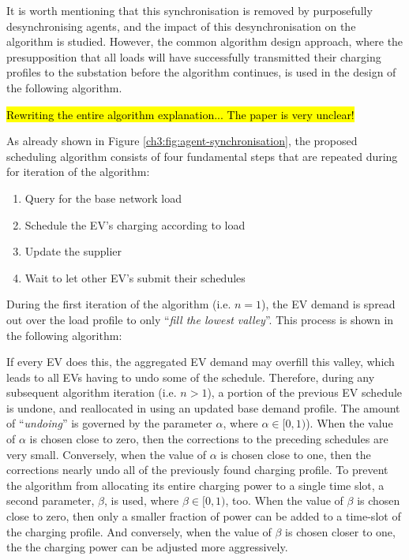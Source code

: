 It is worth mentioning that this synchronisation is removed by purposefully desynchronising agents, and the impact of this desynchronisation on the algorithm is studied.
However, the common algorithm design approach, where the presupposition that all loads will have successfully transmitted their charging profiles to the substation before the algorithm continues, is used in the design of the following algorithm.

\hl{Rewriting the entire algorithm explanation... The paper is very unclear!}

As already shown in Figure \ref{ch3:fig:agent-synchronisation}, the proposed scheduling algorithm consists of four fundamental steps that are repeated during for iteration of the algorithm:

\begin{enumerate}
	\item Query for the base network load
	\item Schedule the EV's charging according to load
	\item Update the supplier
	\item Wait to let other EV's submit their schedules
\end{enumerate}

During the first iteration of the algorithm (i.e. $n=1$), the EV demand is spread out over the load profile to only ``\textit{fill the lowest valley}''.
This process is shown in the following algorithm:



If every EV does this, the aggregated EV demand may overfill this valley, which leads to all EVs having to undo some of the schedule.
Therefore, during any subsequent algorithm iteration (i.e. $n>1$), a portion of the previous EV schedule is undone, and reallocated in using an updated base demand profile.
The amount of ``\textit{undoing}'' is governed by the parameter $\alpha$, where $\alpha \in [0, 1)$).
When the value of $\alpha$ is chosen close to zero, then the corrections to the preceding schedules are very small.
Conversely, when the value of $\alpha$ is chosen close to one, then the corrections nearly undo all of the previously found charging profile.
To prevent the algorithm from allocating its entire charging power to a single time slot, a second parameter, $\beta$, is used, where $\beta \in [0, 1)$, too.
When the value of $\beta$ is chosen close to zero, then only a smaller fraction of power can be added to a time-slot of the charging profile.
And conversely, when the value of $\beta$ is chosen closer to one, the the charging power can be adjusted more aggressively.



